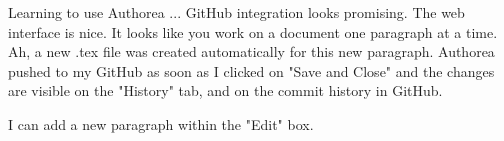 Learning to use Authorea ... GitHub integration looks promising. The web interface is nice. It looks like you work on a document one paragraph at a time. Ah, a new .tex file was created automatically for this new paragraph. Authorea pushed to my GitHub as soon as I clicked on "Save and Close" and the changes are visible on the "History" tab, and on the commit history in GitHub.

I can add a new paragraph within the "Edit" box.